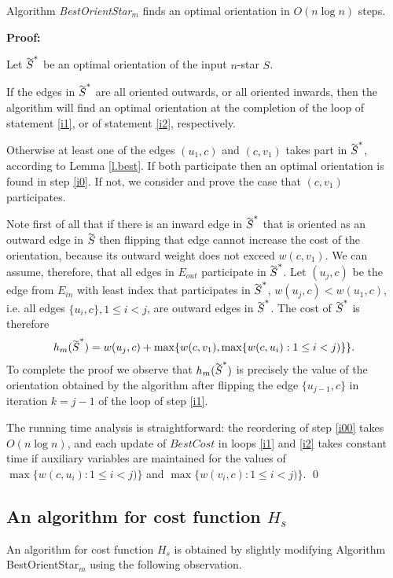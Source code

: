 \begin{theorem}\label{t.star}
Algorithm \emph{BestOrientStar}$_m$ finds an optimal orientation in  $O(n \log n)$ steps.
\end{theorem}  

\noindent \textbf{Proof:}

 Let $\tildeb{S}^*$ be an optimal orientation of the input $n$-star $S$.
 
 If the edges in $\tildeb{S}^*$ are all oriented outwards, or all oriented 
 inwards, then the algorithm will find an optimal orientation
 at the completion of the loop of statement \ref{i1}, or
of statement \ref{i2}, respectively.
 
 Otherwise at least one of the edges $(u_1,c)$ and $(c,v_1)$ takes part 
 in $\tildeb{S}^*$, according to Lemma \ref{l.best}. If both participate then an optimal orientation is found in step \ref{i0}.
 If not, we consider and prove the case that $(c,v_1)$ participates. 
 
 Note first of all that if there is an inward edge in $\tildeb{S}^*$ that is oriented as
 an outward edge in $\tildeb{S}$ then flipping that edge cannot
 increase the cost of the orientation, because its outward weight does not exceed $w(c,v_1)$.
 We can assume, therefore, that all edges in $E_{out}$ participate in $\tildeb{S}^*$. 
 Let $(u_j,c)$ be the 
 edge from $E_{in}$ with least index that participates in $\tildeb{S}^*$, 
  $w(u_j,c)<w(u_1,c)$, i.e. all edges $\{u_i,c\}, 1\leq i<j$, are outward edges in $\tildeb{S}^*$. 
 The cost of $\tildeb{S}^*$ is therefore 
 $$h_m(\tildeb{S}^*)=w(u_j,c)+\max \{w(c,v_1),\max \{w(c,u_i):1\leq i<j)\}\}.$$
To complete the proof we observe that $h_m(\tildeb{S}^*)$ is precisely the value of the orientation
obtained by the algorithm after flipping the edge  $\{u_{j-1},c\}$
 in iteration $k=j-1$ of the loop of step \ref{i1}.

The running time  analysis is straightforward: the reordering of step \ref{i00} takes
$O(n \log n)$, and each update of $BestCost$ in loops \ref{i1} and \ref{i2} takes 
constant time if  auxiliary variables are maintained for the values of 
$\max \{w(c,u_i):1\leq i<j)\}$ and $\max \{w(v_i,c):1\leq i<j)\}$.
 \qed
 
  \subsection{An algorithm for cost function $H_s$}
  An algorithm for cost function $H_s$ is obtained by slightly modifying Algorithm BestOrientStar$_m$ using the following observation.
  
